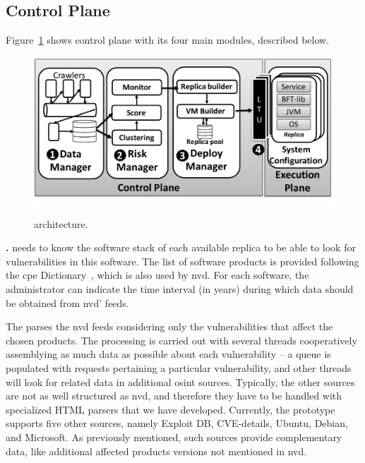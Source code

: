 \subsection*{Control Plane}
\label{sec:lazarus}

Figure~\ref{fig:arch1} shows \system control plane with its four main modules, described below.

\begin{figure}[h]
\begin{center}
\includegraphics[width=.9\columnwidth]{images/images/architecture_new.pdf}
\vspace{-5mm}
\caption{\system architecture.}
\vspace{-5mm}
\label{fig:arch1}
\end{center}
\end{figure}


 \textbf{\fetcher.} \system needs to know the software stack of each available replica to be able to look for vulnerabilities in this software.
The list of software products is provided following the \gls{cpe} Dictionary~\cite{cpe}, which is also used by \gls{nvd}. 
For each software, the administrator can indicate the time interval (in years) during which data should be obtained from \gls{nvd}' feeds.

The \fetcher parses the \gls{nvd} feeds considering only the vulnerabilities that affect the chosen products. 
The processing is carried out with several threads cooperatively assemblying as much data as possible about each vulnerability -- a queue is populated with requests pertaining a particular vulnerability, and other threads will look for related data in additional \gls{osint} sources. 
Typically, the other sources are not as well structured as \gls{nvd}, and therefore they have to be handled with specialized HTML parsers that we have developed. 
Currently, the prototype supports five other sources, namely Exploit DB, CVE-details, Ubuntu, Debian, and Microsoft. 
As previously mentioned, such sources provide complementary data, like additional affected products versions not mentioned in \gls{nvd}.

